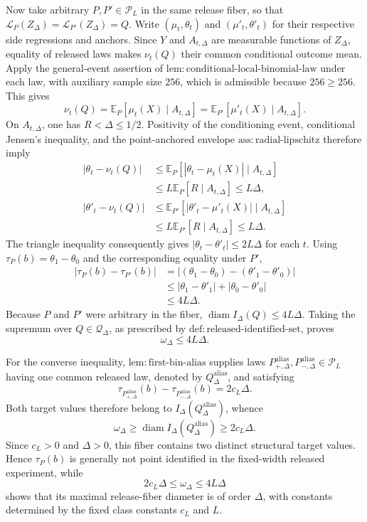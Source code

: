 Now take arbitrary \(P,P'\in\mathcal P_L\) in the same release fiber, so that
\(\mathcal L_P(Z_\Delta)=\mathcal L_{P'}(Z_\Delta)=Q\).  Write \((\mu_t,\theta_t)\) and \((\mu'_t,\theta'_t)\) for their respective side regressions and anchors.  Since \(Y\) and \(A_{t,\Delta}\) are measurable functions of \(Z_\Delta\), equality of released laws makes \(\nu_t(Q)\) their common conditional outcome mean.  Apply the general-event assertion of \(\mathrm{lem:conditional\text{-}local\text{-}binomial\text{-}law}\) under each law, with auxiliary sample size \(256\), which is admissible because \(256\geq256\).  This gives
\[
 \nu_t(Q)
 =\mathbb E_P[\mu_t(X)\mid A_{t,\Delta}]
 =\mathbb E_{P'}[\mu'_t(X)\mid A_{t,\Delta}].
\]
On \(A_{t,\Delta}\), one has \(R<\Delta\leq1/2\).  Positivity of the conditioning event, conditional Jensen's inequality, and the point-anchored envelope \(\mathrm{ass:radial\text{-}lipschitz}\) therefore imply
\[
 \begin{aligned}
 |\theta_t-\nu_t(Q)|
 &\leq \mathbb E_P\!\left[|\theta_t-\mu_t(X)|\mid A_{t,\Delta}\right] \\
 &\leq L\mathbb E_P[R\mid A_{t,\Delta}]
 \leq L\Delta,
 \\[3pt]
 |\theta'_t-\nu_t(Q)|
 &\leq \mathbb E_{P'}\!\left[|\theta'_t-\mu'_t(X)|\mid A_{t,\Delta}\right] \\
 &\leq L\mathbb E_{P'}[R\mid A_{t,\Delta}]
 \leq L\Delta.
 \end{aligned}
\]
The triangle inequality consequently gives \(|\theta_t-\theta'_t|\leq2L\Delta\) for each \(t\).  Using \(\tau_P(b)=\theta_1-\theta_0\) and the corresponding equality under \(P'\),
\[
 \begin{aligned}
 |\tau_P(b)-\tau_{P'}(b)|
 &=| (\theta_1-\theta_0)-(\theta'_1-\theta'_0)| \\
 &\leq |\theta_1-\theta'_1|+|\theta_0-\theta'_0| \\
 &\leq4L\Delta.
 \end{aligned}
\]
Because \(P\) and \(P'\) were arbitrary in the fiber, \(\operatorname{diam}I_\Delta(Q)\leq4L\Delta\).  Taking the supremum over \(Q\in\mathcal Q_\Delta\), as prescribed by \(\mathrm{def:released\text{-}identified\text{-}set}\), proves
\[
 \omega_\Delta\leq4L\Delta.
\]

For the converse inequality, \(\mathrm{lem:first\text{-}bin\text{-}alias}\) supplies laws \(P^{\mathrm{alias}}_{+,\Delta},P^{\mathrm{alias}}_{-,\Delta}\in\mathcal P_L\) having one common released law, denoted by \(Q^{\mathrm{alias}}_\Delta\), and satisfying
\[
 \tau_{P^{\mathrm{alias}}_{+,\Delta}}(b)
 -\tau_{P^{\mathrm{alias}}_{-,\Delta}}(b)
 =2c_L\Delta.
\]
Both target values therefore belong to \(I_\Delta(Q^{\mathrm{alias}}_\Delta)\), whence
\[
 \omega_\Delta
 \geq\operatorname{diam}I_\Delta(Q^{\mathrm{alias}}_\Delta)
 \geq2c_L\Delta.
\]
Since \(c_L>0\) and \(\Delta>0\), this fiber contains two distinct structural target values.  Hence \(\tau_P(b)\) is generally not point identified in the fixed-width released experiment, while
\[
 2c_L\Delta\leq\omega_\Delta\leq4L\Delta
\]
shows that its maximal release-fiber diameter is of order \(\Delta\), with constants determined by the fixed class constants \(c_L\) and \(L\).